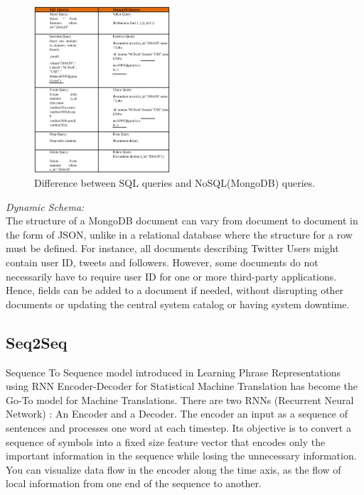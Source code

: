 \documentclass[conference]{IEEEtran}
\begin{document}
\begin{figure}[!ht]
	\centering
	\includegraphics[width=0.45\textwidth]{table-1.jpg}
	\caption{Difference between SQL queries and NoSQL(MongoDB) queries\cite{b6}.}
\end{figure}



\textit{Dynamic Schema:}\\
The structure of a MongoDB document can vary from document to document in the form of JSON, unlike in a relational database where the structure for a row must be defined. For instance, all documents describing Twitter Users might contain user ID, tweets and followers. However, some documents do not necessarily have to require user ID for one or more third-party applications. Hence, fields can be added to a document if needed, without disrupting other documents or updating the central system catalog or having system downtime.

\subsection{\textbf{Seq2Seq}}
Sequence To Sequence model introduced in Learning Phrase Representations using RNN Encoder-Decoder for Statistical Machine Translation\cite{b14} has  become the Go-To model for Machine Translations. There are two  RNNs (Recurrent Neural Network) : An Encoder and a Decoder. The encoder an input as a sequence of sentences and processes one word at each timestep. Its objective is to convert a sequence of symbols into a fixed size feature vector that encodes only the important information in the sequence while losing the unnecessary information. You can visualize data flow in the encoder along the time axis, as the flow of local information from one end of the sequence to another.
\end{document}
